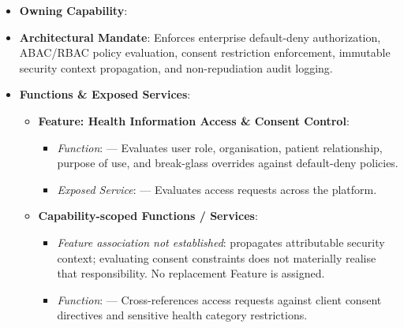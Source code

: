 \begin{itemize}

\item
\textbf{Owning Capability}: \texttt{}



\item
\textbf{Architectural Mandate}: Enforces enterprise default-deny authorization, ABAC/\allowbreak{}RBAC policy evaluation, consent restriction enforcement, immutable security context propagation, and non-repudiation audit logging.



\item
\textbf{Functions \& Exposed Services}:


\begin{itemize}

\item
\textbf{Feature: Health Information Access \& Consent Control}:


\begin{itemize}

\item
\emph{Function}: \texttt{} — Evaluates user role, organisation, patient relationship, purpose of use, and break-glass overrides against default-deny policies.



\item
\emph{Exposed Service}: \texttt{} — Evaluates access requests across the platform.



\end{itemize}


\item
\textbf{Capability-scoped Functions /\allowbreak{} Services}:


\begin{itemize}

\item
\emph{Feature association not established}: \texttt{} propagates attributable security context; evaluating consent constraints does not materially realise that responsibility. No replacement Feature is assigned.



\item
\emph{Function}: \texttt{} — Cross-references access requests against client consent directives and sensitive health category restrictions.




\end{itemize}
\end{itemize}
\end{itemize}
